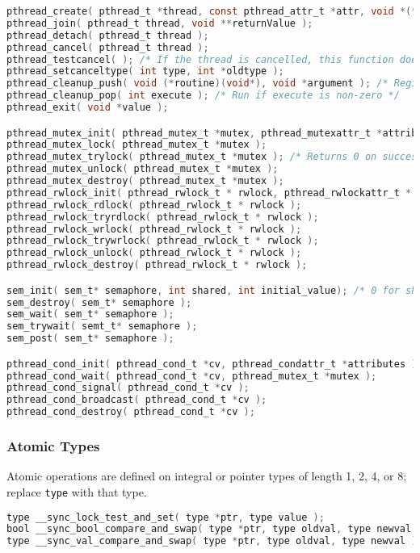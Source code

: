 \documentclass[legalpaper,10pt]{article}
\begin{document}
\begin{lstlisting}[language=C]
pthread_create( pthread_t *thread, const pthread_attr_t *attr, void *(*start_routine)( void * ), void *arg );
pthread_join( pthread_t thread, void **returnValue );
pthread_detach( pthread_t thread );
pthread_cancel( pthread_t thread );
pthread_testcancel( ); /* If the thread is cancelled, this function does not return (thread terminated) */
pthread_setcanceltype( int type, int *oldtype );
pthread_cleanup_push( void (*routine)(void*), void *argument ); /* Register cleanup handler, with argument */ 
pthread_cleanup_pop( int execute ); /* Run if execute is non-zero */
pthread_exit( void *value );

pthread_mutex_init( pthread_mutex_t *mutex, pthread_mutexattr_t *attributes );
pthread_mutex_lock( pthread_mutex_t *mutex );
pthread_mutex_trylock( pthread_mutex_t *mutex ); /* Returns 0 on success */
pthread_mutex_unlock( pthread_mutex_t *mutex );
pthread_mutex_destroy( pthread_mutex_t *mutex );
pthread_rwlock_init( pthread_rwlock_t * rwlock, pthread_rwlockattr_t * attr );
pthread_rwlock_rdlock( pthread_rwlock_t * rwlock );
pthread_rwlock_tryrdlock( pthread_rwlock_t * rwlock );
pthread_rwlock_wrlock( pthread_rwlock_t * rwlock );
pthread_rwlock_trywrlock( pthread_rwlock_t * rwlock );
pthread_rwlock_unlock( pthread_rwlock_t * rwlock );
pthread_rwlock_destroy( pthread_rwlock_t * rwlock );

sem_init( sem_t* semaphore, int shared, int initial_value); /* 0 for shared OK */
sem_destroy( sem_t* semaphore );
sem_wait( sem_t* semaphore );
sem_trywait( semt_t* semaphore );
sem_post( sem_t* semaphore );

pthread_cond_init( pthread_cond_t *cv, pthread_condattr_t *attributes );
pthread_cond_wait( pthread_cond_t *cv, pthread_mutex_t *mutex );
pthread_cond_signal( pthread_cond_t *cv );
pthread_cond_broadcast( pthread_cond_t *cv );
pthread_cond_destroy( pthread_cond_t *cv );
\end{lstlisting}

\subsubsection*{Atomic Types}
Atomic operations are defined on integral or pointer types of length 1, 2, 4, or 8; replace \texttt{type} with that type.

\begin{lstlisting}[language=C]
type __sync_lock_test_and_set( type *ptr, type value );
bool __sync_bool_compare_and_swap( type *ptr, type oldval, type newval );
type __sync_val_compare_and_swap( type *ptr, type oldval, type newval );
\end{lstlisting}
\end{document}
